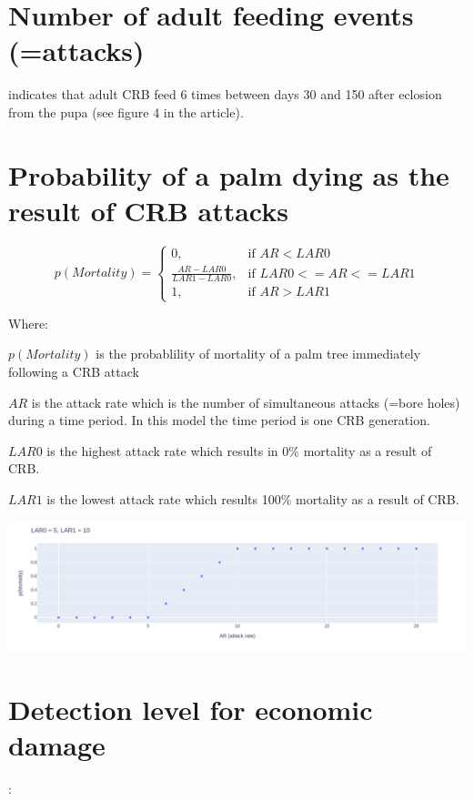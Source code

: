 \documentclass[12pt,letterpaper,english,bibliography=totocnumbered, abstract=on]{scrartcl}
\begin{document}
\section{Number of adult feeding events (=attacks)}

\cite{vander_meer_per_1987} indicates that adult CRB feed 6 times between days 30 and 150 after eclosion from the pupa (see figure 4 in the article).

\newpage
\section{Probability of a palm dying as the result of CRB attacks}

$$
p(Mortality)=
\begin{cases}
0, & \text{if $AR < LAR0$} \\
\frac{AR-LAR0}{LAR1-LAR0}, & \text{if $LAR0 <= AR <= LAR1$} \\
1, & \text{if $AR > LAR1$}
\end{cases}
$$

Where:

$p(Mortality)$ is the probablility of mortality of a palm tree immediately following a CRB attack
	
$AR$ is the attack rate which is the number of simultaneous attacks (=bore holes) during a time period. In this model the time period is one CRB generation.

$LAR0$ is the highest attack rate which results in 0\% mortality as a result of CRB.

$LAR1$ is the lowest attack rate which results 100\% mortality as a result of CRB.

\begin{center}
	\includegraphics[width=\linewidth]{../images/pmort}
\end{center}


\section{Detection level for economic damage}

\cite{hinckley_ecology_1973}:
\end{document}
